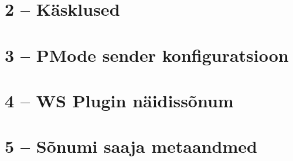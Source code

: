 
\clearpage %
\label{chapter:appendix} %
\chapter*{\appendixTitle~2 -- Käsklused} %


\clearpage
{}
{}\label{chapter:appendix-pmode-sender}
\chapter*{\appendixTitle~3 -- PMode sender konfiguratsioon}


\clearpage
{}
{}\label{chapter:appendix-wsplugin-example}
\chapter*{\appendixTitle~4 -- WS Plugin näidissõnum}


\clearpage
{}
{}\label{chapter:receiver-metadata}
\chapter*{\appendixTitle~5 -- Sõnumi saaja metaandmed}
